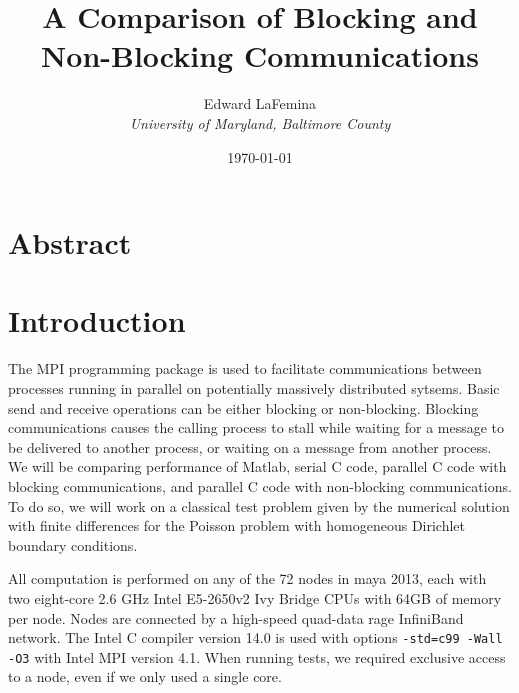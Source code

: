 \documentclass[11pt]{article}
\author{Edward LaFemina \\
		\it{University of Maryland, Baltimore County}}
\title{A Comparison of Blocking and Non-Blocking Communications}
\date{\today}
\begin{document}
\maketitle

\section*{Abstract}

\section{Introduction}
The MPI programming package is used to facilitate communications between processes running in parallel on potentially massively distributed sytsems. Basic send and receive operations can be either blocking or non-blocking. Blocking communications causes the calling process to stall while waiting for a message to be delivered to another process, or waiting on a message from another process. We will be comparing performance of Matlab, serial C code, parallel C code with blocking communications, and parallel C code with non-blocking communications. To do so, we will work on a classical test problem given by the numerical solution with finite differences for the Poisson problem with homogeneous Dirichlet boundary conditions.

All computation is performed on any of the 72 nodes in maya 2013, each with two eight-core 2.6 GHz Intel E5-2650v2 Ivy Bridge CPUs with 64GB of memory per node. Nodes are connected by a high-speed quad-data rage InfiniBand network. The Intel C compiler version 14.0 is used with options \texttt{-std=c99 -Wall -O3} with Intel MPI version 4.1. When running tests, we required exclusive access to a node, even if we only used a single core.
\end{document}
